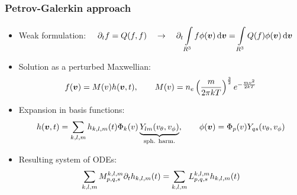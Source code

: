 \documentclass[mathserif, aspectratio=169]{beamer}
\newcommand{\ud}{\,\mathrm{d}}
\newcommand{\vect}[1]{\boldsymbol{#1}}
\newcommand{\of}[1]{\mleft( #1 \mright)}
\newcommand{\vth}{v_{\textrm{th}}}
\newcommand{\myint}[2]{\int\limits_{#1}^{#2}}
\begin{document}
\begin{frame}
\frametitle{Petrov-Galerkin approach}
%
\small
\begin{itemize}

\item Weak formulation:
$
\displaystyle
\quad
\partial_t f = Q(f,f)
\quad \rightarrow \quad
\partial_t \myint{R^3}{} f \phi\of{\vect{v}} \ud \vect{v} =
\myint{R^3}{} Q(f) \phi\of{\vect{v}} \ud \vect{v}
$

\item Solution as a perturbed Maxwellian:
\begin{align*}
f\of{\vect{v}} = M\of{v} h\of{\vect{v},t}
, \quad\quad
M\of{v} = n_e \left( \frac{m}{2 \pi kT }\right)^{\frac32} e^{-\frac{mv^2}{2kT}}
\end{align*}

\item Expansion in basis functions:
\begin{align*}
h\of{\vect{v},t} =
\sum_{k,l,m} h_{k,l,m} \of{t} \Phi_k\of{v} \underbrace{Y_{lm}\of{v_\theta, v_\phi}}_{\tiny\text{sph. harm.}},
\quad
\quad
\phi\of{\vect{v}} = \Phi_p\of{v} Y_{qs}\of{v_\theta, v_\phi}
\end{align*}

\item Resulting system of ODEs:
\begin{align*}
\sum_{k,l,m} M_{p,q,s}^{k,l,m} \partial_t h_{k,l,m}\of{t} = \sum_{k,l,m}  L_{p,q,s}^{k,l,m} h_{k,l,m}\of{t}
\end{align*}
\end{itemize}
%
\end{frame}
\end{document}
